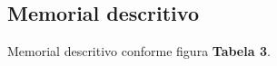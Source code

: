 \documentclass[	DIV=calc,%
							paper=a4,%
							fontsize=12pt,%
							onecolumn]{scrartcl}	 					%
\begin{document}
\subsection{Memorial descritivo}
Memorial descritivo conforme figura \textbf{Tabela 3}. 

\end{document}
